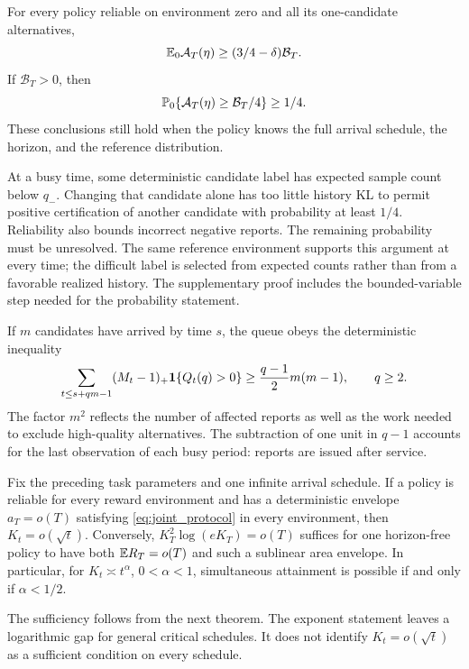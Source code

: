 \documentclass[11pt]{article}
\begin{document}
\begin{theorem}
\label{thm:broadcast}
For every policy reliable on environment zero and all its one-candidate
alternatives,
\[
 \mathbb E_0\mathcal A_T(\eta)\ge(3/4-\delta)\mathcal B_T.
\]
If $\mathcal B_T>0$, then
\[
 \mathbb P_0\{\mathcal A_T(\eta)\ge\mathcal B_T/4\}\ge1/4.
\]
These conclusions still hold when the policy knows the full arrival schedule,
the horizon, and the reference distribution.
\end{theorem}

At a busy time, some deterministic candidate label has expected sample count
below $q_-$. Changing that candidate alone has too little history KL to permit
positive certification of another candidate with probability at least $1/4$.
Reliability also bounds incorrect negative reports. The remaining probability
must be unresolved. The same reference environment supports this argument at
every time; the difficult label is selected from expected counts rather than
from a favorable realized history. The supplementary proof includes the
bounded-variable step needed for the probability statement.

If $m$ candidates have arrived by time $s$, the queue obeys the deterministic
inequality
\begin{equation}
 \sum_{t\le s+qm-1}(M_t-1)_+\mathbf 1\{Q_t(q)>0\}
                  \ge\frac{q-1}{2}m(m-1),\qquad q\ge2.
 \label{eq:queue_area}
\end{equation}
The factor $m^2$ reflects the number of affected reports as well as the work
needed to exclude high-quality alternatives. The subtraction of one unit in
$q-1$ accounts for the last observation of each busy period: reports are issued
after service.

\begin{corollary}
\label{cor:growth}
Fix the preceding task parameters and one infinite arrival schedule. If a
policy is reliable for every reward environment and has a deterministic
envelope $a_T=o(T)$ satisfying \eqref{eq:joint_protocol} in every environment,
then $K_t=o(\sqrt t)$. Conversely, $K_T^2\log(eK_T)=o(T)$ suffices for one
horizon-free policy to have both $\mathbb E R_T=o(T)$ and such a sublinear area
envelope. In particular, for $K_t\asymp t^\alpha$, $0<\alpha<1$, simultaneous
attainment is possible if and only if $\alpha<1/2$.
\end{corollary}

The sufficiency follows from the next theorem. The exponent statement leaves
a logarithmic gap for general critical schedules. It does not identify
$K_t=o(\sqrt t)$ as a sufficient condition on every schedule.
\end{document}
